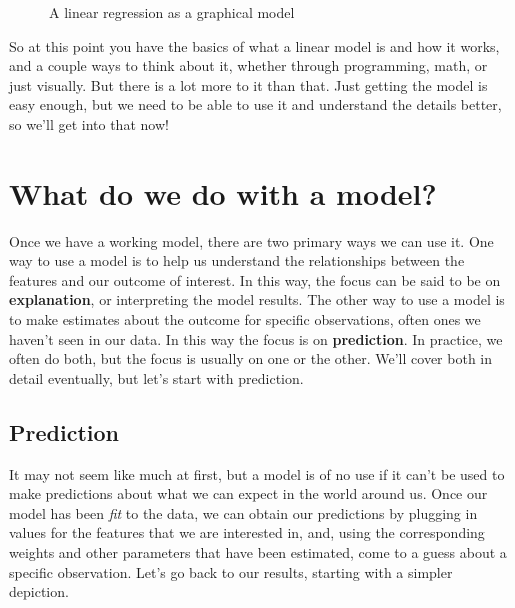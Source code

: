 \documentclass[
  letterpaper,
]{krantz}
\begin{document}
\begin{figure}[H]


\caption{\label{fig-graph-lm}A linear regression as a graphical model}

\end{figure}%

So at this point you have the basics of what a linear model is and how
it works, and a couple ways to think about it, whether through
programming, math, or just visually. But there is a lot more to it than
that. Just getting the model is easy enough, but we need to be able to
use it and understand the details better, so we'll get into that now!

\section{What do we do with a model?}\label{sec-lm-what-do-we-do}

Once we have a working model, there are two primary ways we can use it.
One way to use a model is to help us understand the relationships
between the features and our outcome of interest. In this way, the focus
can be said to be on \textbf{explanation}, or interpreting the model
results. The other way to use a model is to make estimates about the
outcome for specific observations, often ones we haven't seen in our
data. In this way the focus is on \textbf{prediction}. In practice, we
often do both, but the focus is usually on one or the other. We'll cover
both in detail eventually, but let's start with prediction.

\subsection{Prediction}\label{sec-lm-prediction}

It may not seem like much at first, but a model is of no use if it can't
be used to make predictions about what we can expect in the world around
us. Once our model has been \emph{fit} to the data, we can obtain our
predictions by plugging in values for the features that we are
interested in, and, using the corresponding weights and other parameters
that have been estimated, come to a guess about a specific observation.
Let's go back to our results, starting with a simpler depiction.
\end{document}
